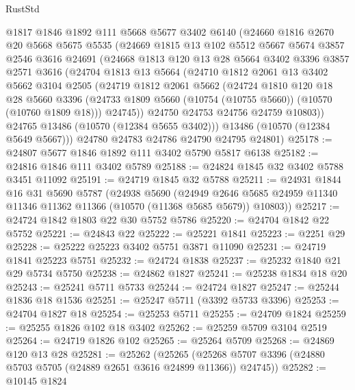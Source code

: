\begin{lexlean}{RustStd}
\begin{coremodule}
    @1817
    @1846
    @1892
    @111
    @5668
    @5677
    @3402
    @6140
    (@24660
      @1816
      @2670
      @20
      @5668
      @5675
      @5535
      (@24669
        @1815
        @13
        @102
        @5512
        @5667
        @5674
        @3857
        @2546
        @3616
        @24691
        (@24668
          @1813
          @120
          @13
          @28
          @5664
          @3402
          @3396
          @3857
          @2571
          @3616
          (@24704
            @1813
            @13
            @5664
            (@24710
              @1812
              @2061
              @13
              @3402
              @5662
              @3104
              @2505
              (@24719
                @1812
                @2061
                @5662
                (@24724
                  @1810
                  @120
                  @18
                  @28
                  @5660
                  @3396
                  (@24733 @1809 @5660 (@10754 (@10755 @5660)) (@10570 (@10760 @1809 @18)))
                  @24745))
              @24750
              @24753
              @24756
              @24759
              @10803))
          @24765
          @13486
          (@10570 (@12384 @5655 @3402)))
        @13486
        (@10570 (@12384 @5649 @5667)))
      @24780
      @24783
      @24786
      @24790
      @24795
      @24801)
@25178 := @24807 @5677 @1846 @1892 @111 @3402 @5790 @5817 @6138
@25182 := @24816 @1846 @111 @3402 @5789
@25188 := @24824 @1845 @32 @3402 @5788 @3451 @11092
@25191 := @24719 @1845 @32 @5788
@25211 := @24931
    @1844
    @16
    @31
    @5690
    @5787
    (@24938
      @5690
      (@24949 @2646 @5685 @24959 @11340 @11346 @11362 @11366 (@10570 (@11368 @5685 @5679)) @10803))
@25217 := @24724 @1842 @1803 @22 @30 @5752 @5786
@25220 := @24704 @1842 @22 @5752
@25221 := @24843 @22
@25222 := @25221 @1841
@25223 := @2251 @29
@25228 := @25222 @25223 @3402 @5751 @3871 @11090
@25231 := @24719 @1841 @25223 @5751
@25232 := @24724 @1838
@25237 := @25232 @1840 @21 @29 @5734 @5750
@25238 := @24862 @1827
@25241 := @25238 @1834 @18 @20
@25243 := @25241 @5711 @5733
@25244 := @24724 @1827
@25247 := @25244 @1836 @18 @1536
@25251 := @25247 @5711 (@3392 @5733 @3396)
@25253 := @24704 @1827 @18
@25254 := @25253 @5711
@25255 := @24709 @1824
@25259 := @25255 @1826 @102 @18 @3402
@25262 := @25259 @5709 @3104 @2519
@25264 := @24719 @1826 @102
@25265 := @25264 @5709
@25268 := @24869 @120 @13 @28
@25281 := @25262
    (@25265 (@25268 @5707 @3396 (@24880 @5703 @5705 (@24889 @2651 @3616 @24899 @11366)) @24745))
@25282 := @10145 @1824

\end{coremodule}
\end{lexlean}
